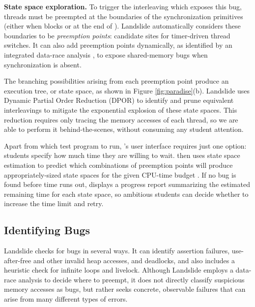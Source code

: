 {\bf State space exploration.}
To trigger the interleaving which exposes this bug, threads must be preempted at the boundaries of the synchronization primitives (either when  blocks or at the end of ).
Landslide automatically considers these boundaries to be {\em preemption points}: candidate sites for timer-driven thread switches.
It can also add preemption points dynamically,
as identified by an integrated data-race analysis \cite{hybriddatarace,fasttrack},
to expose shared-memory bugs when synchronization is absent.

The branching possibilities arising from each preemption point produce an execution tree, or state space,
as shown in Figure \ref{fig:paradise}(b).
Landslide uses Dynamic Partial Order Reduction (DPOR) \cite{dpor} to identify and prune equivalent interleavings
to mitigate the exponential explosion of these state spaces.
This reduction requires only tracing the memory accesses of each thread,
so we are able to perform it behind-the-scenes, without consuming any student attention.

Apart from which test program to run, \landslide's user interface requires just one option:
students specify how much time they are willing to wait.
\landslide then uses state space estimation \cite{estimation} to predict
which combinations of preemption points will produce appropriately-sized state spaces for the given CPU-time budget \cite{quicksand-anonymized}.
If no bug is found before time runs out, \landslide displays a progress report summarizing the estimated remaining time for each state space,
so ambitious students can decide whether to increase the time limit and retry.

\subsection{Identifying Bugs}

Landslide checks for bugs in several ways.
It can identify assertion failures, use-after-free and other invalid heap accesses, and
deadlocks, and also includes a heuristic check for infinite loops and livelock.
Although Landslide employs a data-race analysis to decide where to preempt,
it does not directly classify suspicious memory accesses as bugs,
but rather seeks concrete, observable failures that can arise from many different types of errors.

